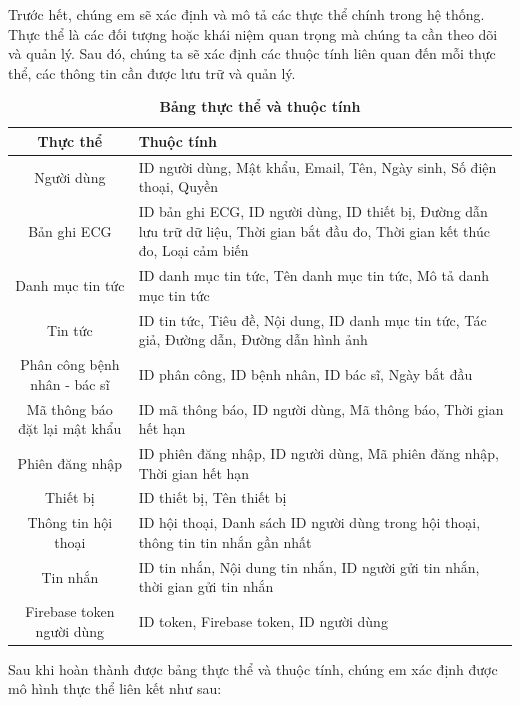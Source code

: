      Trước hết, chúng em sẽ xác định và mô tả các thực thể chính trong hệ
      thống. Thực thể là các đối tượng hoặc khái niệm quan
       trọng mà chúng ta cần theo dõi và quản lý. Sau đó, chúng ta sẽ xác
        định các thuộc tính liên quan đến mỗi thực thể, các thông tin cần
         được lưu trữ và quản lý.

\begin{table}[H]
  \caption{\bfseries \fontsize{12pt}{0pt}\selectfont Bảng thực thể và thuộc tính}
  \centering
  \begin{tabularx}{0.9\textwidth}{|c|X|}
    \hline
    \textbf{Thực thể} & \textbf{Thuộc tính} \\
    \hline
    Người dùng & 
    ID người dùng, Mật khẩu, Email, Tên, Ngày sinh, Số điện thoại, Quyền \\
    \hline
    Bản ghi ECG & 
    ID bản ghi ECG, ID người dùng, ID thiết bị, Đường dẫn lưu trữ dữ liệu, Thời gian bắt đầu đo, Thời gian kết thúc đo, Loại cảm biến \\
    \hline
    Danh mục tin tức & 
    ID danh mục tin tức, Tên danh mục tin tức, Mô tả danh mục tin tức \\
    \hline
    Tin tức & 
    ID tin tức, Tiêu đề, Nội dung, ID danh mục tin tức, Tác giả, Đường dẫn, Đường dẫn hình ảnh \\
    \hline
    Phân công bệnh nhân - bác sĩ & 
    ID phân công, ID bệnh nhân, ID bác sĩ, Ngày bắt đầu \\
    \hline
    Mã thông báo đặt lại mật khẩu & 
    ID mã thông báo, ID người dùng, Mã thông báo, Thời gian hết hạn \\
    \hline
    Phiên đăng nhập & 
    ID phiên đăng nhập, ID người dùng, Mã phiên đăng nhập, Thời gian hết hạn \\
    \hline
    Thiết bị & 
    ID thiết bị, Tên thiết bị \\
    \hline
    Thông tin hội thoại & 
    ID hội thoại, Danh sách ID người dùng trong hội thoại, thông tin tin nhắn gần nhất \\
    \hline
    Tin nhắn & 
    ID tin nhắn, Nội dung tin nhắn, ID người gửi tin nhắn, thời gian gửi tin nhắn \\
    \hline
    Firebase token người dùng & 
    ID token, Firebase token, ID người dùng \\
    \hline
  \end{tabularx}

  Sau khi hoàn thành được bảng thực thể và thuộc tính, chúng em xác định được mô hình thực thể liên kết như sau:

\end{table}

